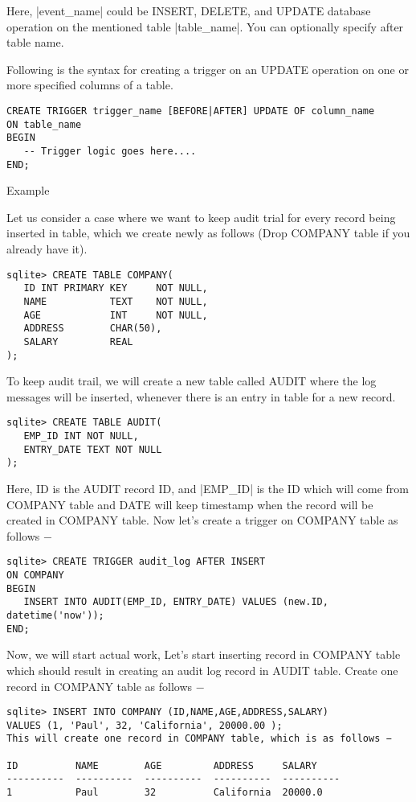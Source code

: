Here, |event_name| could be INSERT, DELETE, and UPDATE database operation on the mentioned table |table_name|. You can optionally specify  after table name.

Following is the syntax for creating a trigger on an UPDATE operation on one or more specified columns of a table.


\begin{verbatim}
CREATE TRIGGER trigger_name [BEFORE|AFTER] UPDATE OF column_name 
ON table_name
BEGIN
   -- Trigger logic goes here....
END;
\end{verbatim}

Example

Let us consider a case where we want to keep audit trial for every record being inserted in  table, which we create newly as follows (Drop COMPANY table if you already have it).


\begin{verbatim}
sqlite> CREATE TABLE COMPANY(
   ID INT PRIMARY KEY     NOT NULL,
   NAME           TEXT    NOT NULL,
   AGE            INT     NOT NULL,
   ADDRESS        CHAR(50),
   SALARY         REAL
);
\end{verbatim}


To keep audit trail, we will create a new table called AUDIT where the log messages will be inserted, whenever there is an entry in  table for a new record.

\begin{verbatim}
sqlite> CREATE TABLE AUDIT(
   EMP_ID INT NOT NULL,
   ENTRY_DATE TEXT NOT NULL
);
\end{verbatim}

Here, ID is the AUDIT record ID, and |EMP_ID| is the ID which will come from COMPANY table and DATE will keep timestamp when the record will be created in COMPANY table. Now let's create a trigger on COMPANY table as follows −

\begin{verbatim}
sqlite> CREATE TRIGGER audit_log AFTER INSERT 
ON COMPANY
BEGIN
   INSERT INTO AUDIT(EMP_ID, ENTRY_DATE) VALUES (new.ID, datetime('now'));
END;
\end{verbatim}

Now, we will start actual work, Let's start inserting record in COMPANY table which should result in creating an audit log record in AUDIT table. Create one record in COMPANY table as follows −

\begin{verbatim}
sqlite> INSERT INTO COMPANY (ID,NAME,AGE,ADDRESS,SALARY)
VALUES (1, 'Paul', 32, 'California', 20000.00 );
This will create one record in COMPANY table, which is as follows −

ID          NAME        AGE         ADDRESS     SALARY
----------  ----------  ----------  ----------  ----------
1           Paul        32          California  20000.0
\end{verbatim}


